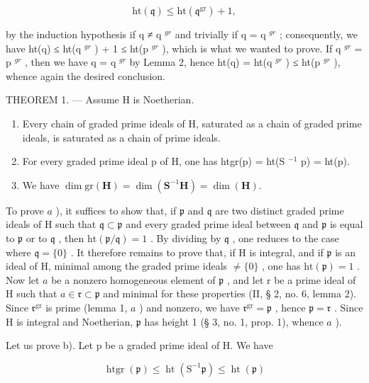 \[
\mathrm{ht} (\mathfrak {q}) \leqslant \mathrm{ht} (\mathfrak {q} ^ {\mathrm{gr}}) + 1,
\]

by the induction hypothesis if q ≠ q \(^{gr}\) and trivially if q = q \(^{gr}\) ; consequently, we have ht(q) ≤ ht(q \(^{gr}\) ) + 1 ≤ ht(p \(^{gr}\) ), which is what we wanted to prove. If q \(^{gr}\) = p \(^{gr}\) , then we have q = q \(^{gr}\) by Lemma 2, hence ht(q) = ht(q \(^{gr}\) ) ≤ ht(p \(^{gr}\) ), whence again the desired conclusion.

THEOREM 1. --- Assume H is Noetherian.

\begin{enumerate}
\def\labelenumi{\alph{enumi})}
\item
  Every chain of graded prime ideals of H, saturated as a chain of graded prime ideals, is saturated as a chain of prime ideals.
\item
  For every graded prime ideal p of H, one has htgr(p) = ht(S \(^{-1}\) p) = ht(p).
\item
  We have \(\dim \mathrm{gr}(\mathbf{H}) = \dim (\mathbf{S}^{-1}\mathbf{H}) = \dim (\mathbf{H}).\)
\end{enumerate}

To prove \(a\) ), it suffices to show that, if \(\mathfrak{p}\) and \(\mathfrak{q}\) are two distinct graded prime ideals of H such that \(\mathfrak{q} \subset \mathfrak{p}\) and every graded prime ideal between \(\mathfrak{q}\) and \(\mathfrak{p}\) is equal to \(\mathfrak{p}\) or to \(\mathfrak{q}\) , then \(\mathrm{ht}(\mathfrak{p}/\mathfrak{q}) = 1\) . By dividing by \(\mathfrak{q}\) , one reduces to the case where \(\mathfrak{q} = \{0\}\) . It therefore remains to prove that, if H is integral, and if \(\mathfrak{p}\) is an ideal of H, minimal among the graded prime ideals \(\neq \{0\}\) , one has \(\mathrm{ht}(\mathfrak{p}) = 1\) . Now let \(a\) be a nonzero homogeneous element of \(\mathfrak{p}\) , and let r be a prime ideal of H such that \(a \in \mathfrak{r} \subset \mathfrak{p}\) and minimal for these properties (II, § 2, no. 6, lemma 2). Since \(\mathfrak{r}^{\mathrm{gr}}\) is prime (lemma 1, \(a\) ) and nonzero, we have \(\mathfrak{r}^{\mathrm{gr}} = \mathfrak{p}\) , hence \(\mathfrak{p} = \mathfrak{r}\) . Since H is integral and Noetherian, \(\mathfrak{p}\) has height 1 (§ 3, no. 1, prop. 1), whence \(a\) ).

Let us prove b). Let p be a graded prime ideal of H. We have

\[
\operatorname{htgr} (\mathfrak {p}) \leqslant \operatorname{ht} \left(\mathrm{S} ^ {- 1} \mathfrak {p}\right) \leqslant \operatorname{ht} (\mathfrak {p})
\]

